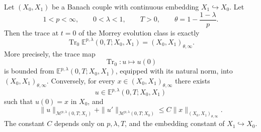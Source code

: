 \documentclass[smallextended,envcountsect,envcountsame]{svjour3}
\begin{document}
\begin{theorem}\label{thm:exact-morrey-trace-space}
	Let \((X_0,X_1)\) be a Banach couple with continuous embedding \(X_1\hookrightarrow X_0\).  Let
	\[
	1<p<\infty,\qquad 0<\lambda<1,\qquad T>0,
	\qquad
	\theta=1-\frac{1-\lambda}{p}.
	\]
	Then the trace at \(t=0\) of the Morrey evolution class is exactly
	\[
	\operatorname{Tr}_{0}\mathbb E^{p,\lambda}(0,T;X_0,X_1)
	=
	(X_0,X_1)_{\theta,\infty}.
	\]
	More precisely, the trace map
	\[
	\operatorname{Tr}_{0}:u\mapsto u(0)
	\]
	is bounded from \(\mathbb E^{p,\lambda}(0,T;X_0,X_1)\), equipped with its natural norm, into \((X_0,X_1)_{\theta,\infty}\).  Conversely, for every \(x\in (X_0,X_1)_{\theta,\infty}\) there exists
	\[
	u\in \mathbb E^{p,\lambda}(0,T;X_0,X_1)
	\]
	such that \(u(0)=x\) in \(X_0\), and
	\[
	\|u\|_{\mathcal M^{p,\lambda}(0,T;X_1)}
	+
	\|u'\|_{\mathcal M^{p,\lambda}(0,T;X_0)}
	\le
	C\|x\|_{(X_0,X_1)_{\theta,\infty}}.
	\]
	The constant \(C\) depends only on \(p,\lambda,T\), and the embedding constant of \(X_1\hookrightarrow X_0\).
	\end{theorem}
\end{document}
